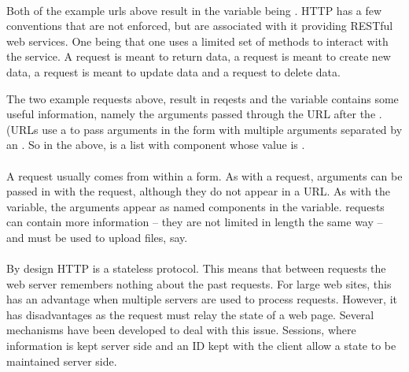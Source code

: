 \paragraph{}
Both of the example urls above result in the variable  being
. HTTP has a few conventions that are not enforced, but
are associated with it providing RESTful web services. One being that
one uses a limited set of methods to interact with the service. A
 request is meant to return data, a  request is
meant to create new data, a  request is meant to update data
and a  request to delete data.

The two example requests above, result in  reqests and the
 variable contains some useful information, namely the
arguments passed through the URL after the . (URLs use a
 to pass arguments in the form  with multiple
arguments separated by an \code{\&}. So in the above,  is a
list with component  whose value is .



\paragraph{}
A  request usually comes from within a form. As with a
 request, arguments can be passed in with the request,
although they do not appear in a URL. As with the
 variable, the arguments appear as named components in the
 variable.  requests can contain more information
-- they are not limited in length the same way --
and must be used to upload files, say.



\paragraph{}

By design HTTP is a stateless protocol. This means that between
requests the web server remembers nothing about the past
requests. For large web sites, this has an advantage when multiple
servers are used to process requests. However, it has disadvantages as
the request must relay the state of a web page. Several mechanisms have
been developed to deal with this issue. Sessions, where information is
kept server side and an ID kept with the client allow a state to be
maintained server side. 


